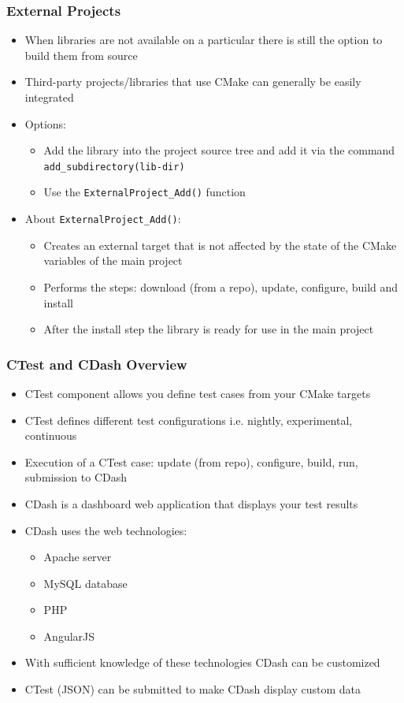 \begin{frame}

  \frametitle{External Projects}
  \begin{itemize}
    \item When libraries are not available on a particular there is still the option to build them from source
    \item Third-party projects/libraries that use CMake can generally be easily integrated
    \item Options:
    \begin{itemize}
      \item Add the library into the project source tree and add it via the command \texttt{add\_subdirectory(lib-dir)}
      \item Use the \texttt{ExternalProject\_Add()} function
    \end{itemize}
    \item About \texttt{ExternalProject\_Add()}:  
    \begin{itemize}
      \item Creates an external target that is not affected by the state of the CMake variables of the main project
      \item Performs the steps: download (from a repo), update, configure, build and install
      \item After the install step the library is ready for use in the main project
    \end{itemize}
  \end{itemize}

\end{frame}

\begin{frame}

  \frametitle{CTest and CDash Overview}

    \begin{itemize}
      \item CTest component allows you define test cases from your CMake targets
      \item CTest defines different test configurations i.e. nightly, experimental, continuous
      \item Execution of a CTest case: update (from repo), configure, build, run, submission to CDash
      \item CDash is a dashboard web application that displays your test results
      \item CDash uses the web technologies:
      \begin{itemize}
        \item Apache server
        \item MySQL database   
        \item PHP
        \item AngularJS
      \end{itemize}
      \item With sufficient knowledge of these technologies CDash can be customized
      \item CTest  (JSON) can be submitted to make CDash display custom data
    \end{itemize}

\end{frame}

